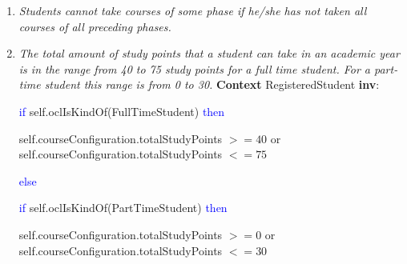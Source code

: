 \begin{enumerate}
	\item \emph{Students cannot take courses of some phase if he/she has not taken
	all courses of all preceding phases.}
		
	\item \emph{The total amount of study points that a student can take in an
	academic year is in the range from 40 to 75 study points for a full time
	student. For a part-time student this range is from 0 to 30.}
	\npar \textbf{Context} RegisteredStudent \textbf{inv}:
	\par \hspace*{5 mm} \textcolor{Blue}{if} self.oclIsKindOf(FullTimeStudent)
	\textcolor{Blue}{then}
	\par \hspace*{10 mm} self.courseConfiguration.totalStudyPoints $>= 40$ or
	self.courseConfiguration.totalStudyPoints $<= 75$
	\par \hspace*{5 mm} \textcolor{Blue}{else}
	\par \hspace*{10 mm} \textcolor{Blue}{if} self.oclIsKindOf(PartTimeStudent)
	\textcolor{Blue}{then}
	\par \hspace*{10 mm} self.courseConfiguration.totalStudyPoints $>= 0$ or
	self.courseConfiguration.totalStudyPoints $<= 30$
\end{enumerate}
